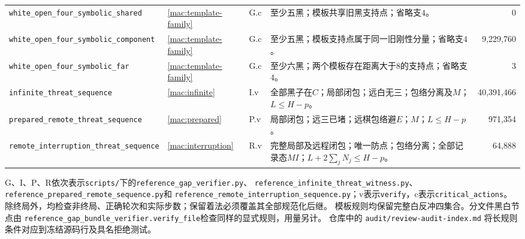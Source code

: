 \documentclass[11pt]{article}
\theoremstyle{definition}
\theoremstyle{remark}
\newcommand{\code}[1]{\texttt{#1}}
\begin{document}
\begin{longtable}{@{}>{\raggedright\arraybackslash}p{.25\linewidth}>{\raggedright\arraybackslash}p{.07\linewidth}>{\raggedright\arraybackslash}p{.09\linewidth}>{\raggedright\arraybackslash}p{.39\linewidth}r@{}}
\texttt{white\_\allowbreak open\_\allowbreak four\_\allowbreak symbolic\_\allowbreak shared} & \ref{mac:template-family} & G.c & 至少五黑；模板共享旧黑支持点；省略支$4$。 & 0\\
\texttt{white\_\allowbreak open\_\allowbreak four\_\allowbreak symbolic\_\allowbreak component} & \ref{mac:template-family} & G.c & 至少五黑；模板支持点属于同一旧刚性分量；省略支$4$。 & 9,229,760\\
\texttt{white\_\allowbreak open\_\allowbreak four\_\allowbreak symbolic\_\allowbreak far} & \ref{mac:template-family} & G.c & 至少六黑；两个模板存在距离大于$8$的支持点；省略支$4$。 & 3\\
\texttt{infinite\_\allowbreak threat\_\allowbreak sequence} & \ref{mac:infinite} & I.v & 全部黑子在$C$；局部闭包；远白无三；包络分离及$M$；$L\le H-p$。 & 40,391,466\\
\texttt{prepared\_\allowbreak remote\_\allowbreak threat\_\allowbreak sequence} & \ref{mac:prepared} & P.v & 局部闭包；远三已堵；远棋包络避$E$；$M$；$L\le H-p$。 & 971,354\\
\texttt{remote\_\allowbreak interruption\_\allowbreak threat\_\allowbreak sequence} & \ref{mac:interruption} & R.v & 完整局部及远程闭包；唯一防点；包络分离；全部记录态$MI$；$L+2\sum_jN_j\le H-p$。 & 64,888\\
\bottomrule
\end{longtable}
\endgroup
\begingroup\par\smallskip\footnotesize\raggedright
G、I、P、R依次表示\texttt{scripts/}下的\texttt{reference\_gap\_verifier.py}、
\texttt{reference\_infinite\_threat\_witness.py}、
\texttt{reference\_prepared\_remote\_sequence.py}和
\texttt{reference\_remote\_interruption\_sequence.py}；v表示\texttt{verify}，c表示\texttt{critical\_actions}。
除终局外，均检查非终局、正确轮次和实际步数；保留着法必须覆盖其全部规范化后继。
模板规则均保留完整白反冲四集合。分文件黑白节点由
\texttt{reference\_gap\_bundle\_verifier.}\allowbreak\texttt{verify\_file}检查同样的显式规则，用量另计。
仓库中的 \code{audit/review-audit-index.md} 将长规则条件对应到冻结源码行及具名拒绝测试。


\par\endgroup
\end{document}
